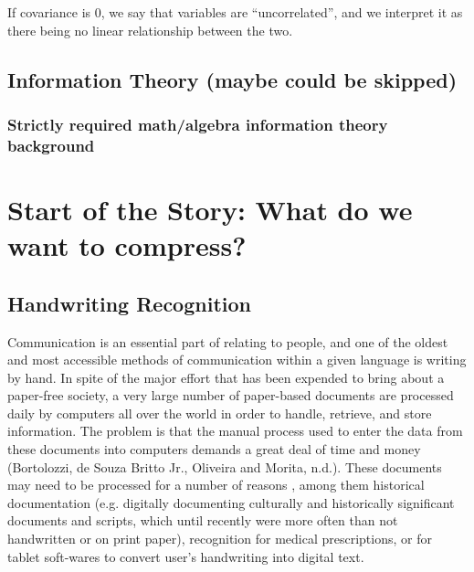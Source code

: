 \documentclass[12pt]{report}
\begin{document}
                If covariance is 0, we say that variables are ``uncorrelated'', and we interpret it as there being no linear relationship between the two.
            
        
        \section{Information Theory (maybe could be skipped)}
        \subsection{Strictly required math/algebra information theory background}
    
    \chapter{Start of the Story: What do we want to compress?}
        \section{Handwriting Recognition}
            Communication is an essential part of relating to people, and one of the oldest and most accessible methods of communication within a given language is writing by hand. In spite of the major effort that has been expended to bring about a paper-free society, a very large number of paper-based documents are processed daily by computers all over the world in order to handle, retrieve, and store information. The problem is that the manual process used to enter the data from these documents into computers demands a great deal of time and money (Bortolozzi, de Souza Britto Jr., Oliveira and Morita, n.d.). These documents may need to be processed for a number of reasons , among them historical documentation (e.g. digitally documenting culturally and historically significant documents and scripts, which until recently were more often than not handwritten or on print paper), recognition for medical prescriptions, or for tablet  soft-wares to convert user's handwriting into digital text.
        
\end{document}
